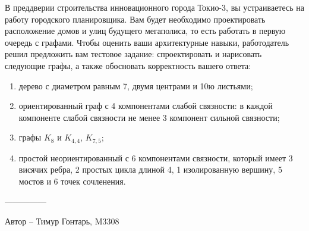 \question
В преддверии строительства инновационного города Токио-3, вы устраиваетесь на работу городского планировщика. Вам будет необходимо проектировать расположение домов и улиц будущего мегаполиса, то есть работать в первую очередь с графами. Чтобы оценить ваши архитектурные навыки, работодатель решил предложить вам тестовое задание: спроектировать и нарисовать следующие графы, а также обосновать корректность вашего ответа:

\begin{enumerate}
\item  дерево с диаметром равным 7, двумя центрами  и  10ю листьями;
\item  ориентированный граф с 4 компонентами слабой связности: в  каждой компоненте слабой связности не менее 3 компонент сильной связности;
\item  графы $K_8$ и $K_{4,4}$, $K_{7,5}$;
\item  простой неориентированный с 6 компонентами связности, который имеет 3 висячих ребра, 2 простых цикла длиной 4, 1 изолированную вершину, 5 мостов и 6 точек сочленения.
\end{enumerate}

---------------

Автор -- Тимур Гонтарь, M3308
